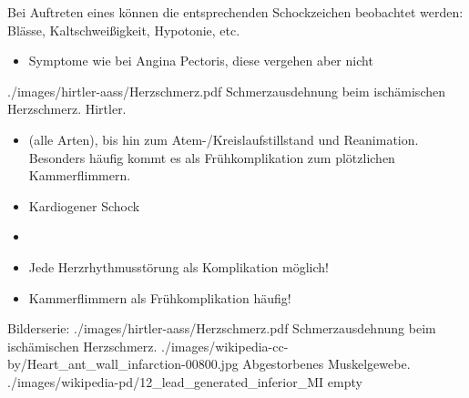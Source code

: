 {{Bei Auftreten eines  können die
entsprechenden Schockzeichen beobachtet werden: Blässe,
Kaltschweißigkeit, Hypotonie, etc.
}{
\begin{itemize}
  \item Symptome wie bei Angina Pectoris, diese vergehen aber nicht
\end{itemize}
}
{./images/hirtler-aass/Herzschmerz.pdf}
{Schmerzausdehnung beim ischämischen
Herzschmerz.}
{Hirtler.}
  
{%
\begin{itemize}
  \item {} (alle Arten), bis hin
  zum Atem-/Kreislaufstillstand und Reanimation.
  Besonders häufig kommt es als Frühkomplikation zum
  plötzlichen Kammerflimmern.
  \item Kardiogener Schock 
\end{itemize}
}{
\begin{itemize}
  \item {}
  \item Jede Herzrhythmusstörung als Komplikation möglich!
  \item Kammerflimmern als Frühkomplikation häufig!
\end{itemize}

}{}{}{}

\begin{PictureSeriesWide}{}{Bilderserie:
}
{./images/hirtler-aass/Herzschmerz.pdf}
{Schmerzausdehnung beim ischämischen
Herzschmerz. }
{./images/wikipedia-cc-by/Heart_ant_wall_infarction-00800.jpg}
{Abgestorbenes Muskelgewebe. }
{./images/wikipedia-pd/12_lead_generated_inferior_MI}
{ }
{empty}
{}
\end{PictureSeriesWide}


}

